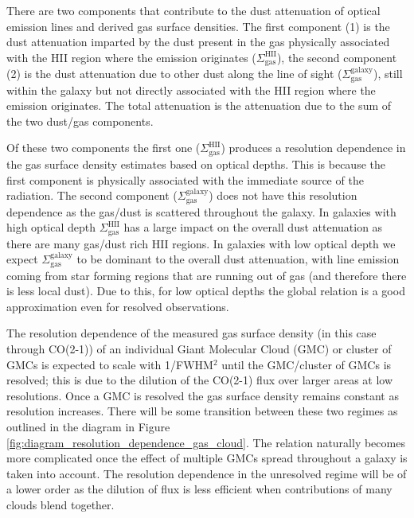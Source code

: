 \documentclass[fleqn,usenatbib]{mnras}
\begin{document}
There are two components that contribute to the dust attenuation of optical emission lines and derived gas surface densities. The first component (1) is the dust attenuation imparted by the dust present in the gas physically associated with the HII region where the emission originates ($\Sigma_{\textrm{gas}}^{\textrm{HII}}$), the second component (2) is the dust attenuation due to other dust along the line of sight ($\Sigma_{\textrm{gas}}^{\textrm{galaxy}}$), still within the galaxy but not directly associated with the HII region where the emission originates. The total attenuation is the attenuation due to the sum of the two dust/gas components.

Of these two components the first one ($\Sigma_{\textrm{gas}}^{\textrm{HII}}$) produces a resolution dependence in the gas surface density estimates based on optical depths. This is because the first component is physically associated with the immediate source of the radiation. The second component ($\Sigma_{\textrm{gas}}^{\textrm{galaxy}}$) does not have this resolution dependence as the gas/dust is scattered throughout the galaxy. In galaxies with high optical depth $\Sigma_{\textrm{gas}}^{\textrm{HII}}$ has a large impact on the overall dust attenuation as there are many gas/dust rich HII regions. In galaxies with low optical depth we expect $\Sigma_{\textrm{gas}}^{\textrm{galaxy}}$ to be dominant to the overall dust attenuation, with line emission coming from star forming regions that are running out of gas (and therefore there is less local dust). Due to this, for low optical depths the global relation is a good approximation even for resolved observations.

The resolution dependence of the measured gas surface density (in this case through CO(2-1)) of an individual Giant Molecular Cloud (GMC) or cluster of GMCs is expected to scale with 1/FWHM$^2$ until the GMC/cluster of GMCs is resolved; this is due to the dilution of the CO(2-1) flux over larger areas at low resolutions. Once a GMC is resolved the gas surface density remains constant as resolution increases. There will be some transition between these two regimes as outlined in the diagram in Figure \ref{fig:diagram_resolution_dependence_gas_cloud}. The relation naturally becomes more complicated once the effect of multiple GMCs spread throughout a galaxy is taken into account. The resolution dependence in the unresolved regime will be of a lower order as the dilution of flux is less efficient when contributions of many clouds blend together.
\end{document}

